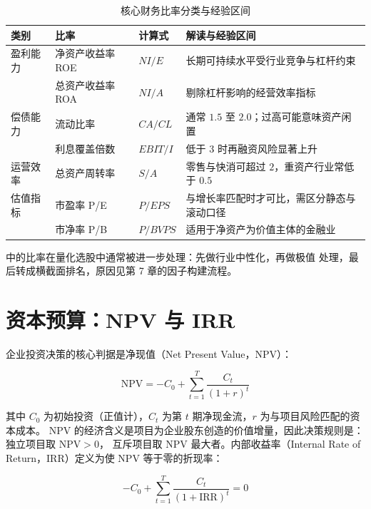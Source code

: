 \begin{table}[htbp]
\centering
\caption{核心财务比率分类与经验区间}\label{tab:01-ratios}
\tablefont
\begin{tabular}{@{}L{2.1cm}L{3.1cm}L{4.2cm}L{4.8cm}@{}}
\toprule
类别 & 比率 & 计算式 & 解读与经验区间 \\
\midrule
盈利能力 & 净资产收益率 ROE & $NI/E$ & 长期可持续水平受行业竞争与杠杆约束 \\
         & 总资产收益率 ROA & $NI/A$ & 剔除杠杆影响的经营效率指标 \\
\midrule
偿债能力 & 流动比率 & $CA/CL$ & 通常 $1.5$ 至 $2.0$；过高可能意味资产闲置 \\
         & 利息覆盖倍数 & $EBIT/I$ & 低于 $3$ 时再融资风险显著上升 \\
\midrule
运营效率 & 总资产周转率 & $S/A$ & 零售与快消可超过 $2$，重资产行业常低于 $0.5$ \\
\midrule
估值指标 & 市盈率 P/E & $P/EPS$ & 与增长率匹配时才可比，需区分静态与滚动口径 \\
         & 市净率 P/B & $P/BVPS$ & 适用于净资产为价值主体的金融业 \\
\bottomrule
\end{tabular}
\end{table}

 中的比率在量化选股中通常被进一步处理：先做行业中性化，再做极值
处理，最后转成横截面排名，原因见第 7 章的因子构建流程。

\section{资本预算：NPV 与 IRR}

企业投资决策的核心判据是净现值（Net Present Value，NPV）：

\begin{equation}\label{eq:01-npv}
  \mathrm{NPV} = -C_0 + \sum_{t=1}^{T}\frac{C_t}{(1+r)^t}
\end{equation}

其中 $C_0$ 为初始投资（正值计），$C_t$ 为第 $t$ 期净现金流，$r$ 为与项目风险匹配的资本成本。
NPV 的经济含义是项目为企业股东创造的价值增量，因此决策规则是：独立项目取 $\mathrm{NPV}>0$，
互斥项目取 NPV 最大者。内部收益率（Internal Rate of Return，IRR）定义为使 NPV 等于零的折现率：

\begin{equation}\label{eq:01-irr}
  -C_0 + \sum_{t=1}^{T}\frac{C_t}{(1+\mathrm{IRR})^t} = 0
\end{equation}

